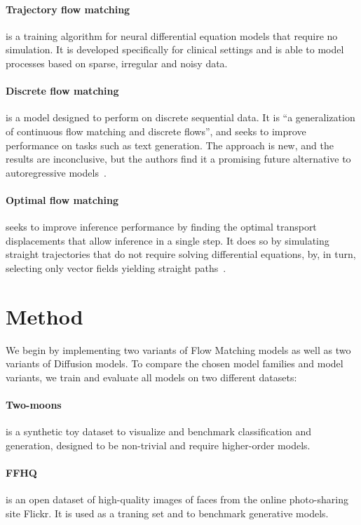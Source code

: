 \documentclass{article}
\begin{document}
\paragraph{Trajectory flow matching} is a training algorithm for neural differential equation models that require no simulation. It is developed specifically for clinical settings and is able to model processes based on sparse, irregular and noisy data. \cite{zhang2024trajectory}

\paragraph{Discrete flow matching} is a model designed to perform on discrete sequential data. It is ``a generalization of continuous flow matching and discrete flows'', and seeks to improve performance on tasks such as text generation. The approach is new, and the results are inconclusive, but the authors find it a promising future alternative to autoregressive models~\cite{gat2024discrete}.

\paragraph{Optimal flow matching} seeks to improve inference performance by finding the optimal transport displacements that allow inference in a single step. It does so by simulating straight trajectories that do not require solving differential equations, by, in turn, selecting only vector fields yielding straight paths~\cite{kornilov2024optimal}.

\section{Method}

We begin by implementing two variants of Flow Matching models as well as two variants of Diffusion models. To compare the chosen model families and model variants, we train and evaluate all models on two different datasets:

\paragraph{Two-moons} is a synthetic toy dataset to visualize and benchmark classification and generation, designed to be non-trivial and require higher-order models.

\paragraph{FFHQ} is an open dataset of high-quality images of faces from the online photo-sharing site Flickr. It is used as a traning set and to benchmark generative models.
\end{document}
